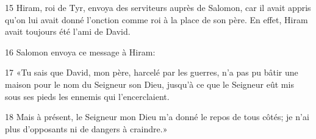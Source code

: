 
15 Hiram, roi de Tyr, envoya des serviteurs auprès de Salomon, car il avait appris qu’on lui avait donné l’onction comme roi à la place de son père. En effet, Hiram avait toujours été l’ami de David.

16 Salomon envoya ce message à Hiram:

17 «Tu sais que David, mon père, harcelé par les guerres, n’a pas pu bâtir une maison pour le nom du Seigneur son Dieu, jusqu’à ce que le Seigneur eût mis sous ses pieds les ennemis qui l’encerclaient.

18 Mais à présent, le Seigneur mon Dieu m’a donné le repos de tous côtés; je n’ai plus d’opposants ni de dangers à craindre.»
